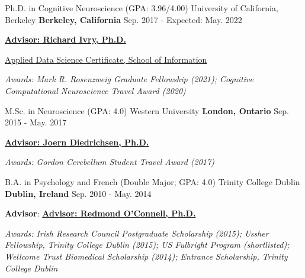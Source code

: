 

\begin{cventries}

  \cventry
    {Ph.D. in Cognitive Neuroscience (GPA: 3.96/4.00)} %
    {University of California, Berkeley} %
    {\textbf{Berkeley, California}} %
    {Sep. 2017 - Expected: May. 2022} %
    {
      \begin{cvitems} %
        \item {{\href{http://ivrylab.berkeley.edu/rich-ivry.html}{\textbf{Advisor: Richard Ivry, Ph.D.}}}}
        \item {{\href{https://www.ischool.berkeley.edu/programs/data-science-certificate}{Applied Data Science Certificate, School of Information}}}
        \item {\textit{Awards: Mark R. Rosenzweig Graduate Fellowship (2021); Cognitive Computational Neuroscience Travel Award (2020)}}
      \end{cvitems}
    }

  \cventry
    {M.Sc. in Neuroscience (GPA: 4.0)} %
    {Western University} %
    {\textbf{London, Ontario}} %
    {Sep. 2015 - May. 2017} %
    {
      \begin{cvitems} %
        \item {{\href{http://www.diedrichsenlab.org/}{\textbf{Advisor: Joern Diedrichsen, Ph.D.}}}}
        \item {\textit{Awards: Gordon Cerebellum Student Travel Award (2017)}}
      \end{cvitems}
    }
    
  \cventry
    {B.A. in Psychology and French (Double Major; GPA: 4.0)} %
    {Trinity College Dublin} %
    {\textbf{Dublin, Ireland}} %
    {Sep. 2010 - May. 2014} %
    {
      \begin{cvitems} %
        \item {\textbf{Advisor}: {\href{https://oconnell-lab.com/home/meet-the-team/redmond-oconnell/}{\textbf{Advisor: Redmond O'Connell, Ph.D.}}}}
        \item {\textit{Awards: Irish Research Council Postgraduate Scholarship (2015); Ussher Fellowship, Trinity College Dublin (2015); US Fulbright Program (shortlisted); Wellcome Trust Biomedical Scholarship (2014); Entrance Scholarship, Trinity College Dublin}}
      \end{cvitems}
    }

\end{cventries}
